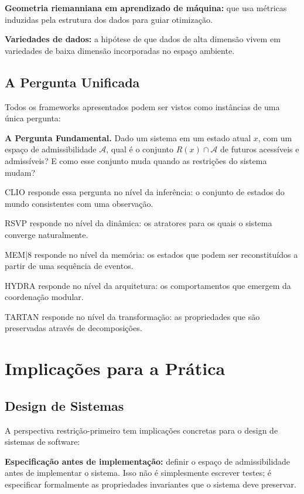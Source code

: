 \documentclass[11pt, a4paper]{article}
\theoremstyle{named}
\begin{document}
\textbf{Geometria riemanniana em aprendizado de máquina:} que usa
métricas induzidas pela estrutura dos dados para guiar otimização.

\textbf{Variedades de dados:} a hipótese de que dados de alta dimensão
vivem em variedades de baixa dimensão incorporadas no espaço ambiente.

\subsection{A Pergunta Unificada}

Todos os frameworks apresentados podem ser vistos como instâncias de
uma única pergunta:

\begin{caixachave}
\textbf{A Pergunta Fundamental.} Dado um sistema em um estado atual
$x$, com um espaço de admissibilidade $\mathcal{A}$, qual é o conjunto
$R(x) \cap \mathcal{A}$ de futuros acessíveis e admissíveis? E como
esse conjunto muda quando as restrições do sistema mudam?
\end{caixachave}

CLIO responde essa pergunta no nível da inferência: o conjunto de
estados do mundo consistentes com uma observação.

RSVP responde no nível da dinâmica: os atratores para os quais o
sistema converge naturalmente.

MEM|8 responde no nível da memória: os estados que podem ser
reconstituídos a partir de uma sequência de eventos.

HYDRA responde no nível da arquitetura: os comportamentos que emergem
da coordenação modular.

TARTAN responde no nível da transformação: as propriedades que são
preservadas através de decomposições.

\section{Implicações para a Prática}

\subsection{Design de Sistemas}

A perspectiva restrição-primeiro tem implicações concretas para o
design de sistemas de software:

\textbf{Especificação antes de implementação:} definir o espaço de
admissibilidade antes de implementar o sistema. Isso não é
simplesmente escrever testes; é especificar formalmente as
propriedades invariantes que o sistema deve preservar.
\end{document}
